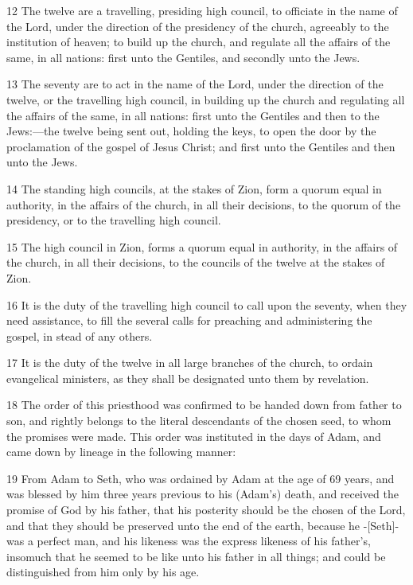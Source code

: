 				12 The twelve are a travelling, presiding high council, to officiate in the name of the Lord, under the direction of the presidency of the church, agreeably to the institution of heaven; to build up the church, and regulate all the affairs of the same, in all nations: first unto the Gentiles, and secondly unto the Jews.

				13 The seventy are to act in the name of the Lord, under the direction of the twelve, or the travelling high council, in building up the church and regulating all the affairs of the same, in all nations: first unto the Gentiles and then to the Jews:---the twelve being sent out, holding the keys, to open the door by the proclamation of the gospel of Jesus Christ; and first unto the Gentiles and then unto the Jews.

				14 The standing high councils, at the stakes of Zion, form a quorum equal in authority, in the affairs of the church, in all their decisions, to the quorum of the presidency, or to the travelling high council.

				15 The high council in Zion, forms a quorum equal in authority, in the affairs of the church, in all their decisions, to the councils of the twelve at the stakes of Zion.

				16 It is the duty of the travelling high council to call upon the seventy, when they need assistance, to fill the several calls for preaching and administering the gospel, in stead of any others.

				17 It is the duty of the twelve in all large branches of the church, to ordain evangelical ministers, as they shall be designated unto them by revelation.

				18 The order of this priesthood was confirmed to be handed down from father to son, and rightly belongs to the literal descendants of the chosen seed, to whom the promises were made. This order was instituted in the days of Adam, and came down by lineage in the following manner:

				19 From Adam to Seth, who was ordained by Adam at the age of 69 years, and was blessed by him three years previous to his (Adam's) death, and received the promise of God by his father, that his posterity should be the chosen of the Lord, and that they should be preserved unto the end of the earth, because he -[Seth]- was a perfect man, and his likeness was the express likeness of his father's, insomuch that he seemed to be like unto his father in all things; and could be distinguished from him only by his age.

